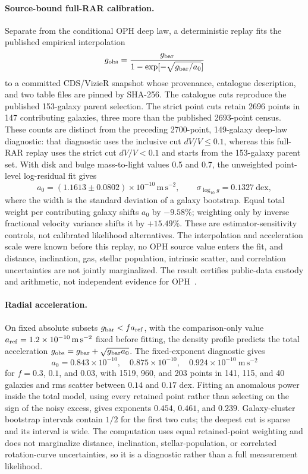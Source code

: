 \documentclass[11pt]{article}
\begin{document}
\paragraph{Source-bound full-RAR calibration.}
Separate from the conditional OPH deep law, a deterministic replay fits the
published empirical interpolation
\[
g_{\rm obs}=\frac{g_{\rm bar}}
 {1-\exp[-\sqrt{g_{\rm bar}/a_0}]}
\]
to a committed CDS/VizieR snapshot whose provenance, catalogue description,
and two table files are pinned by SHA-256. The catalogue cuts reproduce the
published 153-galaxy parent selection. The strict point cuts retain 2696
points in 147 contributing galaxies, three more than the published 2693-point
census. These counts are distinct from the preceding 2700-point, 149-galaxy
deep-law diagnostic: that diagnostic uses the inclusive cut
\(dV/V\le0.1\), whereas this full-RAR replay uses the strict cut
\(dV/V<0.1\) and starts from the 153-galaxy parent set. With disk and bulge
mass-to-light values 0.5 and 0.7, the unweighted
point-level log-residual fit gives
\[
a_0=(1.1613\mathbin{\pm}0.0802)\times10^{-10}\,\mathrm{m\,s^{-2}},
\qquad \sigma_{\log_{10}g}=0.1327\ \mathrm{dex},
\]
where the width is the standard deviation of a galaxy bootstrap. Equal total
weight per contributing galaxy shifts \(a_0\) by \(-9.58\%\); weighting only
by inverse fractional velocity variance shifts it by \(+15.49\%\). These are
estimator-sensitivity controls, not calibrated likelihood alternatives. The
interpolation and acceleration scale were known before this replay, no OPH
source value enters the fit, and distance, inclination, gas, stellar
population, intrinsic scatter, and correlation uncertainties are not jointly
marginalized. The result certifies public-data custody and arithmetic, not
independent evidence for OPH~\cite{mls2016,ophrar}.

\paragraph{Radial acceleration.}
On fixed absolute subsets \(g_{\rm bar}<f a_{\rm ref}\), with the
comparison-only value
\(a_{\rm ref}=1.2\times10^{-10}\,\mathrm{m\,s^{-2}}\) fixed before fitting,
the density profile predicts the total acceleration
\(g_{\rm obs}=g_{\rm bar}+\sqrt{g_{\rm bar}a_0}\). The fixed-exponent
diagnostic gives
\[
a_0=0.843\times10^{-10},\quad 0.875\times10^{-10},\quad 0.924\times10^{-10}\ \mathrm{m\,s^{-2}}
\]
for \(f=0.3\), \(0.1\), and \(0.03\), with 1519, 960, and 203 points in 141,
115, and 40 galaxies and rms scatter between \(0.14\) and \(0.17\) dex. Fitting
an anomalous power inside the total model, using every retained point rather
than selecting on the sign of the noisy excess, gives exponents \(0.454\),
\(0.461\), and \(0.239\). Galaxy-cluster bootstrap intervals contain
\(1/2\) for the first two cuts; the deepest cut is sparse and its interval is
wide. The computation uses equal retained-point weighting and does not
marginalize distance, inclination, stellar-population, or correlated
rotation-curve uncertainties, so it is a diagnostic rather than a full
measurement likelihood.
\end{document}
